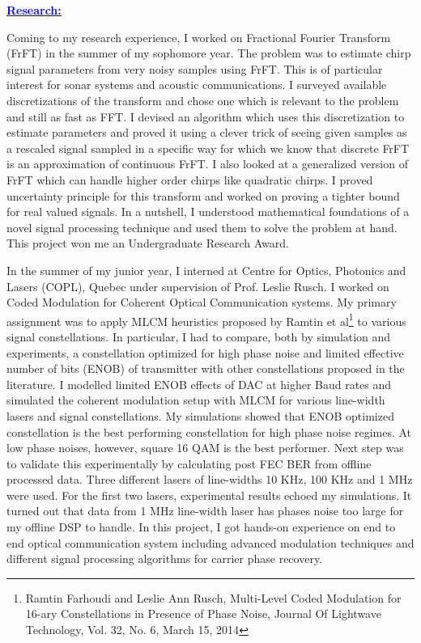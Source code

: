 \documentclass[11pt]{article}
\newcommand{\statement}[1]{\par\medskip
  \underline{\textcolor{blue}{\textbf{#1:}}}\space
}
\begin{document}
\statement{Research}
Coming to my research experience, I worked on Fractional Fourier Transform (FrFT) in the summer of my sophomore year.
The problem was to estimate chirp signal parameters from very noisy samples using FrFT. This is of particular interest for sonar systems and acoustic communications. 
I surveyed available discretizations of the transform and chose one which is relevant to the problem and still as fast as FFT. 
I devised an algorithm which uses this discretization to estimate parameters and proved it using a clever trick of seeing given samples as a rescaled signal sampled in a specific way for which we know that discrete FrFT is an approximation of continuous FrFT. 
I also looked at a generalized version of FrFT which can handle higher order chirps like quadratic chirps. 
I proved uncertainty principle for this transform and worked on proving a tighter bound for real valued signals. 
In a nutshell, I understood mathematical foundations of a novel signal processing technique and used them to solve the problem at hand. This project won me an Undergraduate Research Award.

In the summer of my junior year, I interned at Centre for Optics, Photonics and Lasers (COPL), Quebec under supervision of Prof. Leslie Rusch. I worked on Coded Modulation for Coherent Optical Communication systems. 
My primary assignment was to apply MLCM heuristics proposed by Ramtin et al\footnote{ Ramtin Farhoudi and Leslie Ann Rusch, Multi-Level Coded Modulation for 16-ary Constellations in Presence of Phase Noise, Journal Of Lightwave Technology, Vol. 32, No. 6, March 15, 2014}
to various signal constellations. 
In particular, I had to compare, both by simulation and experiments, a constellation optimized for high phase noise and limited effective number of bits (ENOB) of transmitter with other constellations proposed in the literature. 
I modelled limited ENOB effects of DAC at higher Baud rates and simulated the coherent modulation setup with MLCM for various line-width lasers and signal constellations.
 My simulations showed that ENOB optimized constellation is the best performing constellation for high phase noise regimes. 
At low phase noises, however, square 16 QAM is the best performer. Next step was to validate this experimentally by calculating post FEC BER from offline processed data. 
Three different lasers of line-widths 10 KHz, 100 KHz and 1 MHz were used. For the first two lasers, experimental results echoed my simulations. 
It turned out that data from 1 MHz line-width laser has phases noise too large for my offline DSP to handle. 
In this project, I got hands-on experience on end to end optical communication system including advanced modulation techniques and different signal processing algorithms for carrier phase recovery.
\end{document}
